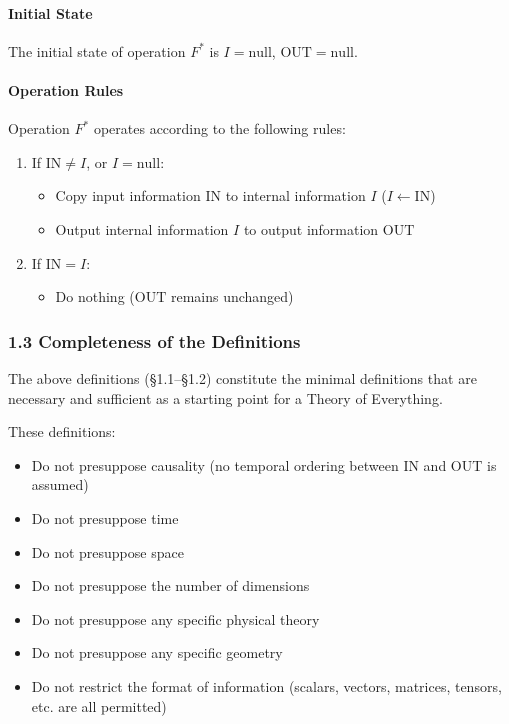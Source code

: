 \documentclass[a4paper,11pt]{article}
\providecommand{\tightlist}{\setlength{\itemsep}{0pt}\setlength{\parskip}{0pt}}
\begin{document}
\paragraph{Initial State}\label{initial-state}

The initial state of operation \(F^*\) is \(I = \mathrm{null}\),
\(\mathrm{OUT} = \mathrm{null}\).

\paragraph{Operation Rules}\label{operation-rules}

Operation \(F^*\) operates according to the following rules:

\begin{enumerate}
\def\labelenumi{\arabic{enumi}.}
\tightlist
\item
  If \(\mathrm{IN} \neq I\), or \(I = \mathrm{null}\):

  \begin{itemize}
  \tightlist
  \item
    Copy input information \(\mathrm{IN}\) to internal information \(I\)
    (\(I \leftarrow \mathrm{IN}\))
  \item
    Output internal information \(I\) to output information
    \(\mathrm{OUT}\)
  \end{itemize}
\item
  If \(\mathrm{IN} = I\):

  \begin{itemize}
  \tightlist
  \item
    Do nothing (\(\mathrm{OUT}\) remains unchanged)
  \end{itemize}
\end{enumerate}

\subsubsection{1.3 Completeness of the
Definitions}\label{completeness-of-the-definitions}

The above definitions (§1.1--§1.2) constitute the minimal definitions
that are necessary and sufficient as a starting point for a Theory of
Everything.

These definitions:

\begin{itemize}
\tightlist
\item
  Do not presuppose causality (no temporal ordering between IN and OUT
  is assumed)
\item
  Do not presuppose time
\item
  Do not presuppose space
\item
  Do not presuppose the number of dimensions
\item
  Do not presuppose any specific physical theory
\item
  Do not presuppose any specific geometry
\item
  Do not restrict the format of information (scalars, vectors, matrices,
  tensors, etc. are all permitted)
\end{itemize}
\end{document}
